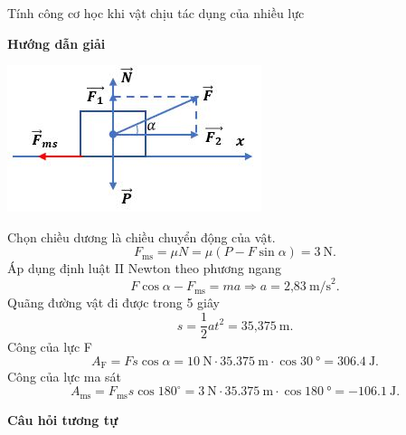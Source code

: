 	\begin{dang}{Tính công cơ học khi vật chịu tác dụng của nhiều lực}
		{	\begin{center}
				\textbf{Hướng dẫn giải}
			\end{center}
			
			\begin{center}
				\includegraphics[scale=0.8]{../figs/VN10-PH-30-L-022-1-1.JPG}
			\end{center}
			
			Chọn chiều dương là chiều chuyển động của vật. 
			\begin{equation*}
				F_{\text{ms}} = \mu N=\mu (P-F\sin \alpha) = 3\ \text{N}.
			\end{equation*}
			Áp dụng định luật II Newton theo phương ngang
			\begin{equation*}
				F\cos \alpha - F_{\text{ms}} =ma \Rightarrow a = \text{2,83}\ \text{m/s}^2.
			\end{equation*}
			Quãng đường vật đi được trong 5 giây 
			\begin{equation*}
				s = \dfrac{1}{2}at^2=\text{35,375}\ \text{m}.
			\end{equation*}
			Công của lực F
			\begin{equation*}
				A_{\text{F}} = Fs \cos \alpha =\SI{10}{\newton}\cdot\SI{35.375}{\meter}\cdot\cos\SI{30}{\degree}=\SI{306.4}{\joule}.
			\end{equation*}
			Công của lực ma sát
			\begin{equation*}
				A_{\text{ms}} = F_{\text{ms}}s \cos 180^\circ =\SI{3}{\newton}\cdot\SI{35.375}{\meter}\cdot\cos\SI{180}{\degree}=\SI{-106.1}{\joule}.
			\end{equation*}
			
			\begin{center}
				\textbf{Câu hỏi tương tự}
			\end{center}
			
}
\end{dang}
